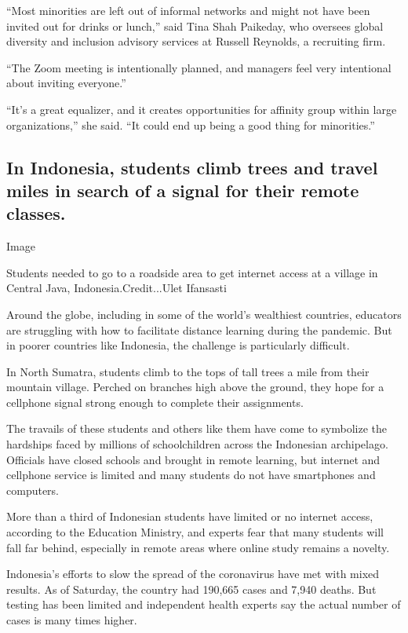``Most minorities are left out of informal networks and might not have
been invited out for drinks or lunch,'' said Tina Shah Paikeday, who
oversees global diversity and inclusion advisory services at Russell
Reynolds, a recruiting firm.

``The Zoom meeting is intentionally planned, and managers feel very
intentional about inviting everyone.''

``It's a great equalizer, and it creates opportunities for affinity
group within large organizations,'' she said. ``It could end up being a
good thing for minorities.''

\hypertarget{in-indonesia-students-climb-trees-and-travel-miles-in-search-of-a-signal-for-their-remote-classes}{%
\subsection{In Indonesia, students climb trees and travel miles in
search of a signal for their remote
classes.}\label{in-indonesia-students-climb-trees-and-travel-miles-in-search-of-a-signal-for-their-remote-classes}}

Image

Students needed to go to a roadside area to get internet access at a
village in Central Java, Indonesia.Credit...Ulet Ifansasti

Around the globe, including in some of the world's wealthiest countries,
educators are struggling with how to facilitate distance learning during
the pandemic. But in poorer countries like Indonesia, the challenge is
particularly difficult.

In North Sumatra, students climb to the tops of tall trees a mile from
their mountain village. Perched on branches high above the ground, they
hope for a cellphone signal strong enough to complete their assignments.

The travails of these students and others like them have come to
symbolize the hardships faced by millions of schoolchildren across the
Indonesian archipelago. Officials have closed schools and brought in
remote learning, but internet and cellphone service is limited and many
students do not have smartphones and computers.

More than a third of Indonesian students have limited or no internet
access, according to the Education Ministry, and experts fear that many
students will fall far behind, especially in remote areas where online
study remains a novelty.

Indonesia's efforts to slow the spread of the coronavirus have met with
mixed results. As of Saturday, the country had 190,665 cases and 7,940
deaths. But testing has been limited and independent health experts say
the actual number of cases is many times higher.


